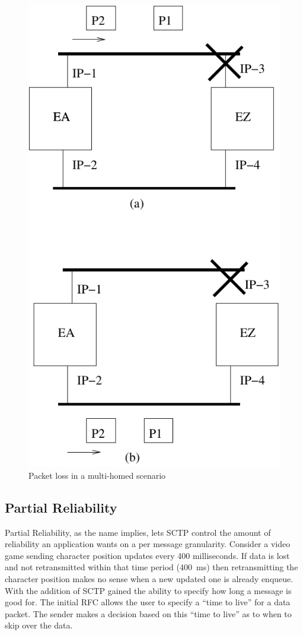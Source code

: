 \documentclass[conference]{IEEEtran}
\begin{document}
\begin{figure}
\includegraphics{multihome}
\caption{Packet loss in a multi-homed scenario}
\label{mhomeloss}
\end{figure}


\subsection{Partial Reliability}
\label{prsctp}
Partial Reliability, as the name implies, lets SCTP control the 
amount of reliability an application wants on a per message granularity.
Consider a video game sending character position updates every 400 milliseconds.
If data is lost and not retransmitted within that time period (400~ms) then
retransmitting the character position makes no sense when a new
updated one is already enqueue. With the addition of \cite{rfc3758} SCTP
gained the ability to specify how long a message is good for.  The initial
RFC allows the user to specify a ``time to live'' for a data packet. The 
sender makes a decision based on this ``time to live'' as to when to
skip over the data. 
\end{document}
